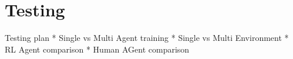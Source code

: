 \chapter{Testing}\label{ch:testing-of-the-implementation}
Testing plan
 * Single vs Multi Agent training
 * Single vs Multi Environment
 * RL Agent comparison
 * Human AGent comparison